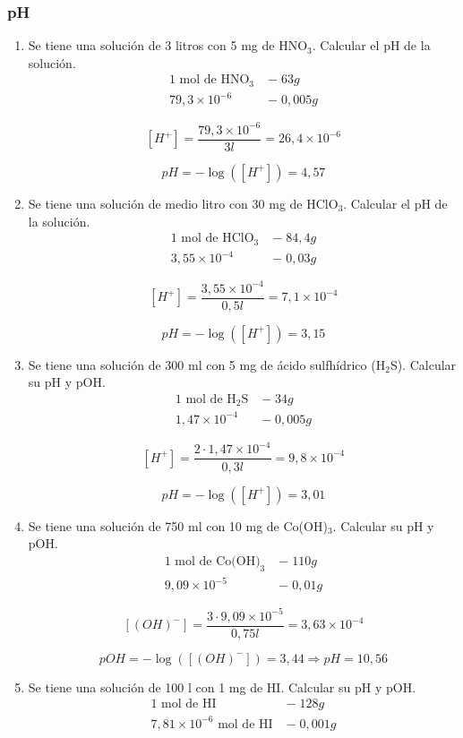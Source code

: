 \subsubsection*{pH}

\begin{enumerate}
\item Se tiene una solución de 3 litros con 5 mg de HNO$_3$. 
Calcular el pH de la solución.
\begin{align*}
\text{1 mol de HNO}_3 \;&-\; 63 g\\
 79,3\times 10^{-6} \;&-\; 0,005g
\end{align*}

$$[H^+] =  \dfrac{79,3\times 10^{-6}}{3l} = 26,4 \times 10^{-6}$$

$$pH=-\log([H^+]) = 4,57$$

\item Se tiene una solución de medio litro con 30 mg de HClO$_3$. Calcular el pH de la solución.
\begin{align*}
\text{1 mol de HClO}_3 \;&-\; 84,4 g\\
 3,55\times 10^{-4} \;&-\; 0,03g
\end{align*}

$$[H^+] =  \dfrac{3,55\times 10^{-4}}{0,5l} = 
7,1 \times 10^{-4}$$

$$pH=-\log([H^+]) = 3,15$$

\skipline
\item Se tiene una solución de 300 ml con 5 mg de ácido sulfhídrico (H$_2$S). Calcular su pH y pOH.
\begin{align*}
\text{1 mol de H}_2\text{S} \;&-\; 34 g\\
 1,47\times 10^{-4} \;&-\; 0,005g
\end{align*}

\skipline

$$[H^+] =  \dfrac{ 2\cdot 1,47\times 10^{-4}}{0,3l} = 
9,8 \times 10^{-4}$$

$$pH=-\log([H^+]) = 3,01$$

\skipline
\item Se tiene una solución de 750 ml con 10 mg de Co(OH)$_3$. Calcular su pH y pOH.
\begin{align*}
\text{1 mol de Co(OH)}_3 \;&-\; 110 g\\
 9,09\times 10^{-5} \;&-\; 0,01g
\end{align*}

\skipline

$$[(OH)^-] =  \dfrac{ 3\cdot  9,09\times 10^{-5}}{0,75l} = 
3,63 \times 10^{-4}$$

$$pOH=-\log([(OH)^-]) = 3,44
\Rightarrow pH = 10,56$$

\skipline
\item Se tiene una solución de 100 l con 1 mg de HI. Calcular su pH y pOH.
\begin{align*}
\text{1 mol de HI} \;&-\; 128 g\\
 7,81\times 10^{-6} \text{ mol de HI} \;&-\; 0,001g
\end{align*}
\end{enumerate}
